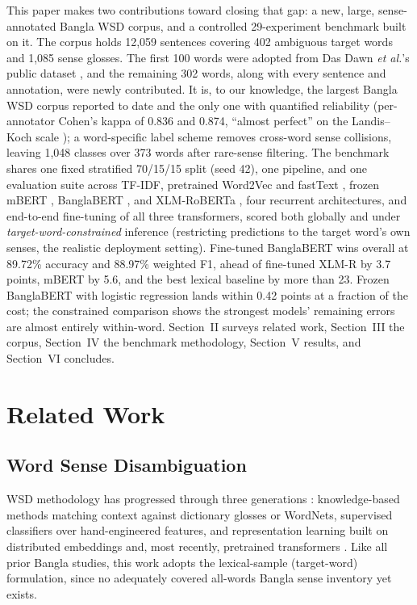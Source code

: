 \documentclass[conference]{IEEEtran}
\begin{document}
This paper makes two contributions toward closing that gap: a new, large, sense-annotated Bangla WSD corpus, and a controlled 29-experiment benchmark built on it. The corpus holds 12,059 sentences covering 402 ambiguous target words and 1,085 sense glosses. The first 100 words were adopted from Das Dawn \emph{et al.}'s public dataset \cite{dasdawn2023}, and the remaining 302 words, along with every sentence and annotation, were newly contributed. It is, to our knowledge, the largest Bangla WSD corpus reported to date and the only one with quantified reliability (per-annotator Cohen's kappa of 0.836 and 0.874, ``almost perfect'' on the Landis--Koch scale \cite{cohen1960kappa,landis1977kappa}); a word-specific label scheme removes cross-word sense collisions, leaving 1,048 classes over 373 words after rare-sense filtering. The benchmark shares one fixed stratified 70/15/15 split (seed 42), one pipeline, and one evaluation suite across TF-IDF, pretrained Word2Vec \cite{mikolov2013word2vec} and fastText \cite{bojanowski2017fasttext}, frozen mBERT \cite{devlin2019bert}, BanglaBERT \cite{bhattacharjee2022banglabert}, and XLM-RoBERTa \cite{conneau2020xlmr}, four recurrent architectures, and end-to-end fine-tuning of all three transformers, scored both globally and under \emph{target-word-constrained} inference (restricting predictions to the target word's own senses, the realistic deployment setting). Fine-tuned BanglaBERT wins overall at 89.72\% accuracy and 88.97\% weighted F1, ahead of fine-tuned XLM-R by 3.7 points, mBERT by 5.6, and the best lexical baseline by more than 23. Frozen BanglaBERT with logistic regression lands within 0.42 points at a fraction of the cost; the constrained comparison shows the strongest models' remaining errors are almost entirely within-word. Section~II surveys related work, Section~III the corpus, Section~IV the benchmark methodology, Section~V results, and Section~VI concludes.

\section{Related Work}
\subsection{Word Sense Disambiguation}
WSD methodology has progressed through three generations \cite{navigli2009wsd}: knowledge-based methods matching context against dictionary glosses or WordNets, supervised classifiers over hand-engineered features, and representation learning built on distributed embeddings \cite{mikolov2013word2vec,bojanowski2017fasttext} and, most recently, pretrained transformers \cite{devlin2019bert}. Like all prior Bangla studies, this work adopts the lexical-sample (target-word) formulation, since no adequately covered all-words Bangla sense inventory yet exists.
\end{document}
